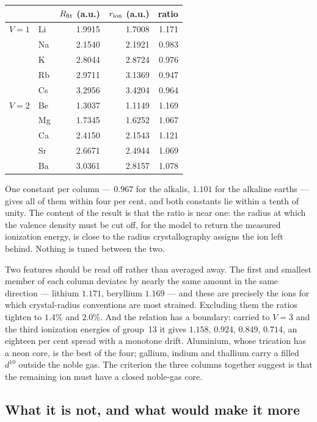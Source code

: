 \begin{center}
\begin{tabular}{llrrr}
\toprule
 & & $R_{\rm fit}$ (a.u.) & $r_{\rm ion}$ (a.u.) & ratio \\
\midrule
$V=1$ & Li & 1.9915 & 1.7008 & 1.171 \\
      & Na & 2.1540 & 2.1921 & 0.983 \\
      & K  & 2.8044 & 2.8724 & 0.976 \\
      & Rb & 2.9711 & 3.1369 & 0.947 \\
      & Cs & 3.2956 & 3.4204 & 0.964 \\
\midrule
$V=2$ & Be & 1.3037 & 1.1149 & 1.169 \\
      & Mg & 1.7345 & 1.6252 & 1.067 \\
      & Ca & 2.4150 & 2.1543 & 1.121 \\
      & Sr & 2.6671 & 2.4944 & 1.069 \\
      & Ba & 3.0361 & 2.8157 & 1.078 \\
\bottomrule
\end{tabular}
\end{center}

One constant per column --- $0.967$ for the alkalis, $1.101$ for the alkaline earths --- gives all
of them within four per cent, and both constants lie within a tenth of unity. The content of the
result is that the ratio is near one: the radius at which the valence density must be cut off,
for the model to return the measured ionization energy, is close to the radius crystallography
assigns the ion left behind. Nothing is tuned between the two.

Two features should be read off rather than averaged away. The first and smallest member of each
column deviates by nearly the same amount in the same direction --- lithium $1.171$, beryllium
$1.169$ --- and these are precisely the ions for which crystal-radius conventions are most
strained. Excluding them the ratios tighten to $1.4\%$ and $2.0\%$. And the relation has a
boundary: carried to $V=3$ and the third ionization energies of group~13 it gives $1.158$,
$0.924$, $0.849$, $0.714$, an eighteen per cent spread with a monotone drift. Aluminium, whose
trication has a neon core, is the best of the four; gallium, indium and thallium carry a filled
$d^{10}$ outside the noble gas. The criterion the three columns together suggest is that the
remaining ion must have a closed noble-gas core.

\subsection*{What it is not, and what would make it more}

